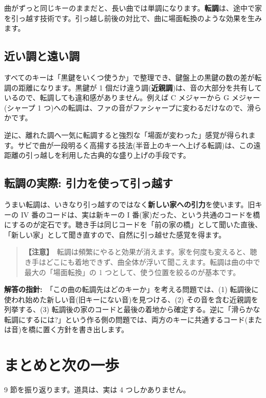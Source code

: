 \documentclass{article}
\begin{document}
曲がずっと同じキーのままだと、長い曲では単調になります。\textbf{転調}は、途中で家を引っ越す技術です。引っ越し前後の対比で、曲に場面転換のような効果を生みます。

\subsection{近い調と遠い調}

すべてのキーは「黒鍵をいくつ使うか」で整理でき、鍵盤上の黒鍵の数の差が転調の距離になります。黒鍵が 1 個だけ違う調(\textbf{近親調})は、音の大部分を共有しているので、転調しても違和感がありません。例えば C メジャーから G メジャー(シャープ 1 つ)への転調は、ファの音がファシャープに変わるだけなので、滑らかです。

逆に、離れた調へ一気に転調すると強烈な「場面が変わった」感覚が得られます。サビで曲が一段明るく高揚する技法(半音上のキーへ上げる転調)は、この遠距離の引っ越しを利用した古典的な盛り上げの手段です。

\subsection{転調の実際: 引力を使って引っ越す}

うまい転調は、いきなり引っ越すのではなく\textbf{新しい家への引力}を使います。旧キーの IV 番のコードは、実は新キーの I 番(家)だった、という共通のコードを橋にするのが定石です。聴き手は同じコードを「前の家の橋」として聞いた直後、「新しい家」として聞き直すので、自然に引っ越せた感覚を得ます。

\begin{quote}
\textbf{【注意】}\ 転調は頻繁にやると効果が消えます。家を何度も変えると、聴き手はどこにも着地できず、曲全体が浮いて聞こえます。転調は曲の中で最大の「場面転換」の 1 つとして、使う位置を絞るのが基本です。
\end{quote}

\textbf{解答の指針:}\ 「この曲の転調先はどのキーか」を考える問題では、(1) 転調後に使われ始めた新しい音(旧キーにない音)を見つける、(2) その音を含む近親調を列挙する、(3) 転調後の家のコードと最後の着地から確定する。逆に「滑らかな転調にするには?」という作る側の問題では、両方のキーに共通するコード(または音)を橋に置く方針を書き出します。

\section{まとめと次の一歩}

9 節を振り返ります。道具は、実は 4 つしかありません。
\end{document}
